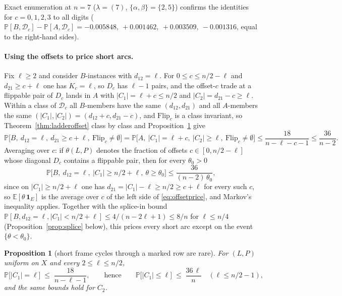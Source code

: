 \documentclass[11pt]{article}
\newtheorem{proposition}[theorem]{Proposition}
\theoremstyle{definition}
\newcommand{\E}{\mathbb{E}}
\renewcommand{\Pr}{\mathbb{P}}
\begin{document}
Exact enumeration at $n=7$ ($\lambda=(7)$, $\{\alpha,\beta\}=\{2,5\}$)
confirms the identities for $c=0,1,2,3$ to all digits
($\Pr[B,\mathcal D_c]-\Pr[A,\mathcal D_c]=-0.005848,\ +0.001462,\
+0.003509,\ -0.001316$, equal to the right-hand sides).

\paragraph{Using the offsets to price short arcs.}  Fix $\ell\ge2$ and
consider $B$-instances with $d_{12}=\ell$.  For $0\le c\le n/2-\ell$
and $d_{21}\ge c+\ell$ one has $K_c=\ell$, so $D_c$ has $\ell-1$ pairs,
and the offset-$c$ trade at a flippable pair of $D_c$ lands in $A$
with $|C_1|=\ell+c\le n/2$ and $|C_2|=d_{21}-c\ge\ell$.  Within a
class of $\mathcal D_c$ all $B$-members have the same $(d_{12},d_{21})$
and all $A$-members the same $(|C_1|,|C_2|)=(d_{12}+c,d_{21}-c)$, and
$\mathrm{Flip}_c$ is a class invariant, so Theorem~\ref{thm:ladderoffset}
class by class and Proposition~\ref{prop:trapped} give
\begin{equation}\label{eq:offsetprice}
\Pr\bigl[B,\ d_{12}=\ell,\ d_{21}\ge c+\ell,\ \mathrm{Flip}_c\ne\emptyset\bigr]
=\Pr\bigl[A,\ |C_1|=\ell+c,\ |C_2|\ge\ell,\ \mathrm{Flip}_c\ne\emptyset\bigr]
\le\frac{18}{n-\ell-c-1}\le\frac{36}{n-2}.
\end{equation}
Averaging over $c$: if $\theta(L,P)$ denotes the fraction of offsets
$c\in[0,n/2-\ell]$ whose diagonal $D_c$ contains a flippable pair,
then for every $\theta_0>0$
\begin{equation}\label{eq:offsetavg}
\Pr\bigl[B,\ d_{12}=\ell,\ |C_1|\ge n/2+\ell,\ \theta\ge\theta_0\bigr]\le\frac{36}{(n-2)\,\theta_0},
\end{equation}
since on $|C_1|\ge n/2+\ell$ one has $d_{21}=|C_1|-\ell\ge n/2\ge c+\ell$
for every such $c$, so $\E[\theta\,\mathbf 1_E]$ is the average over
$c$ of the left side of \eqref{eq:offsetprice}, and Markov's
inequality applies.  Together with the splice-in bound
$\Pr[B,d_{12}=\ell,|C_1|<n/2+\ell]\le4/(n-2\ell+1)\le8/n$ for
$\ell\le n/4$ (Proposition~\ref{prop:splice} below), this prices every short arc except on
the event $\{\theta<\theta_0\}$.


\begin{proposition}[short frame cycles through a marked row are rare]
\label{prop:trapped}
For $(L,P)$ uniform on $X$ and every $2\le\ell\le n/2$,
\[
\Pr\bigl[|C_1|=\ell\bigr]\;\le\;\frac{18}{n-\ell-1},
\qquad\text{hence}\qquad
\Pr\bigl[|C_1|\le \ell\bigr]\;\le\;\frac{36\,\ell}{n}\quad(\ell\le n/2-1),
\]
and the same bounds hold for $C_2$.
\end{proposition}
\end{document}
